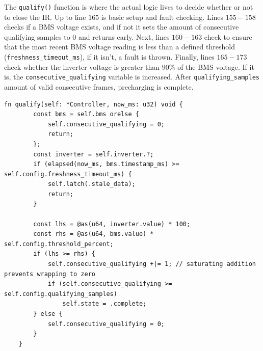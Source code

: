 \documentclass{article}
\begin{document}
The \texttt{qualify()} function is where the actual logic lives to decide whether or not to close the IR. Up to line $165$ is basic setup and fault checking. Lines $155-158$ checks if a BMS voltage exists, and if not it sets the amount of consecutive qualifying samples to $0$ and returns early. Next, lines $160-163$ check to ensure that the most recent BMS voltage reading is less than a defined threshold (\texttt{freshness\_timeout\_ms}), if it isn't, a fault is thrown. Finally, lines $165-173$ check whether the inverter voltage is greater than $90\%$ of the BMS voltage. If it is, the \texttt{consecutive\_qualifying} variable is increased. After \texttt{qualifying\_samples} amount of valid consecutive frames, precharging is complete.
\begin{lstlisting}[language=Zig, backgroundcolor=\color{codebg}, firstnumber=154]
    fn qualify(self: *Controller, now_ms: u32) void {
        const bms = self.bms orelse {
            self.consecutive_qualifying = 0;
            return;
        };
        const inverter = self.inverter.?;
        if (elapsed(now_ms, bms.timestamp_ms) >= self.config.freshness_timeout_ms) {
            self.latch(.stale_data);
            return;
        }

        const lhs = @as(u64, inverter.value) * 100;
        const rhs = @as(u64, bms.value) * self.config.threshold_percent;
        if (lhs >= rhs) {
            self.consecutive_qualifying +|= 1; // saturating addition prevents wrapping to zero
            if (self.consecutive_qualifying >= self.config.qualifying_samples)
                self.state = .complete;
        } else {
            self.consecutive_qualifying = 0;
        }
    }
\end{lstlisting}
\end{document}
